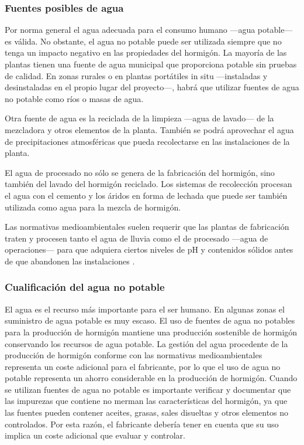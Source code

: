 \subsubsection{Fuentes posibles de agua}

Por norma general el agua adecuada para el consumo humano —agua potable— es válida. No obstante, el agua no potable puede ser utilizada siempre que no tenga un impacto negativo en las propiedades del hormigón. La mayoría de las plantas tienen una fuente de agua municipal que proporciona potable sin pruebas de calidad. En zonas rurales o en plantas portátiles in situ —instaladas y desinstaladas en el propio lugar del proyecto—, habrá que utilizar fuentes de agua no potable como ríos o masas de agua.

Otra fuente de agua es la reciclada de la limpieza —agua de lavado— de la mezcladora y otros elementos de la planta. También se podrá aprovechar el agua de precipitaciones atmosféricas que pueda recolectarse en las instalaciones de la planta.

El agua de procesado no sólo se genera de la fabricación del hormigón, sino también del lavado del hormigón reciclado. Los sistemas de recolección procesan el agua con el cemento y los áridos en forma de lechada que puede ser también utilizada como agua para la mezcla de hormigón.

Las normativas medioambientales suelen requerir que las plantas de fabricación traten y procesen tanto el agua de lluvia como el de procesado —agua de operaciones— para que adquiera ciertos niveles de pH y contenidos sólidos antes de que abandonen las instalaciones \cite{ermco}.

\subsubsection{Cualificación del agua no potable}
El agua es el recurso más importante para el ser humano. En algunas zonas el suministro de agua potable es muy escaso. El uso de fuentes de agua no potables para la producción de hormigón mantiene una producción sostenible de hormigón conservando los recursos de agua potable. La gestión del agua procedente de la producción de hormigón conforme con las normativas medioambientales representa un coste adicional para el fabricante, por lo que el uso de agua no potable representa un ahorro considerable en la producción de hormigón. Cuando se utilizan fuentes de agua no potable es importante verificar y documentar que las impurezas que contiene no merman las características del hormigón, ya que las fuentes pueden contener aceites, grasas, sales disueltas y otros elementos no controlados. Por esta razón, el fabricante debería tener en cuenta que su uso implica un coste adicional que evaluar y controlar.

